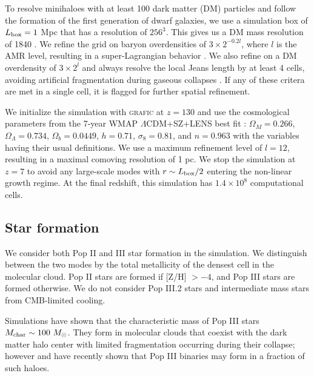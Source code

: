 \documentclass[useAMS,usenatbib]{mn2e}
\begin{document}
To resolve minihaloes with at least 100 dark matter (DM) particles and
follow the formation of the first generation of dwarf galaxies, we use
a simulation box of $L_{\rm box} = 1$ Mpc that has a resolution of
$256^3$.  This gives us a DM mass resolution of 1840 \Ms.  We refine
the grid on baryon overdensities of $3 \times 2^{-0.2l}$, where $l$ is
the AMR level, resulting in a super-Lagrangian behavior \citep[also
see][]{OShea08}.  We also refine on a DM overdensity of $3 \times 2^l$
and always resolve the local Jeans length by at least 4 cells,
avoiding artificial fragmentation during gaseous collapses
\citep{Truelove97}.  If any of these critera are met in a single cell,
it is flagged for further spatial refinement.

We initialize the simulation with \textsc{grafic}
\citep{Bertschinger01} at $z = 130$ and use the cosmological
parameters from the 7-year WMAP $\Lambda$CDM+SZ+LENS best fit
\citep{WMAP7}: $\Omega_M = 0.266$, $\Omega_\Lambda = 0.734$, $\Omega_b
= 0.0449$, $h = 0.71$, $\sigma_8 = 0.81$, and $n = 0.963$ with the
variables having their usual definitions.  We use a maximum refinement
level of $l = 12$, resulting in a maximal comoving resolution of 1 pc.
We stop the simulation at $z=7$ to avoid any large-scale modes with $r
\sim L_{\rm box}/2$ entering the non-linear growth regime.  At the
final redshift, this simulation has $1.4 \times 10^8$ computational
cells.

\subsection{Star formation}

We consider both Pop II and III star formation in the simulation.  We
distinguish between the two modes by the total metallicity of the
densest cell in the molecular cloud.  Pop II stars are formed if [Z/H]
$> -4$, and Pop III stars are formed otherwise.  We do not consider
Pop III.2 stars and intermediate mass stars from CMB-limited cooling.

Simulations have shown that the characteristic mass of Pop III stars
$M_{\rm char} \sim 100~\Ms$.  They form in molecular clouds that
coexist with the dark matter halo center with limited fragmentation
occurring during their collapse; however \citet{2009Sci...325..601T}
and \citet{Stacy10_Binary} have recently shown that Pop III binaries
may form in a fraction of such haloes.
\end{document}
